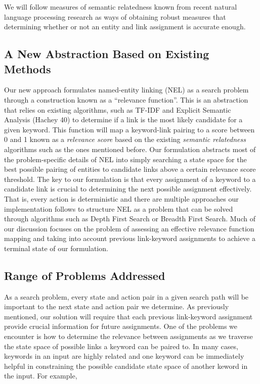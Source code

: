 \documentclass[twoside,11pt]{article}
\begin{document}
We will follow measures of semantic relatedness known from recent natural language processing research as ways of obtaining robust measures that determining whether or not an entity and link assignment is accurate enough.

\subsection{A New Abstraction Based on Existing Methods}

Our new approach formulates named-entity linking (NEL) as a search problem through a construction known as a “relevance function”. This is an abstraction that relies on existing algorithms, such as TF-IDF and Explicit Semantic Analysis (Hachey 40) to determine if a link is the most likely candidate for a given keyword. This function will map a keyword-link pairing to a score between 0 and 1 known as a \textit{relevance score} based on the existing \textit{semantic relatedness} algorithms such as the ones mentioned before. Our formulation abstracts most of the problem-specific details of NEL into simply searching a state space for the best possible pairing of entities to candidate links above a certain relevance score threshold. The key to our formulation is that every assignment of a keyword to a candidate link is crucial to determining the next possible assignment effectively. That is, every action is deterministic and there are multiple approaches our implementation follows to structure NEL as a problem that can be solved through algorithms such as Depth First Search or Breadth First Search. Much of our discussion focuses on the problem of assessing an effective relevance function mapping and taking into account previous link-keyword assignments to achieve a terminal state of our formulation.

\subsection{Range of Problems Addressed}

As a search problem, every state and action pair in a given search path will be important to the next state and action pair we determine. As previously mentioned, our solution will require that each previous link-keyword assignment provide crucial information for future assignments. One of the problems we encounter is how to determine the relevance between assignments as we traverse the state space of possible links a keyword can be paired to. In many cases, keywords in an input are highly related and one keyword can be immediately helpful in constraining the possible candidate state space of another keword in the input. For example,
\end{document}
